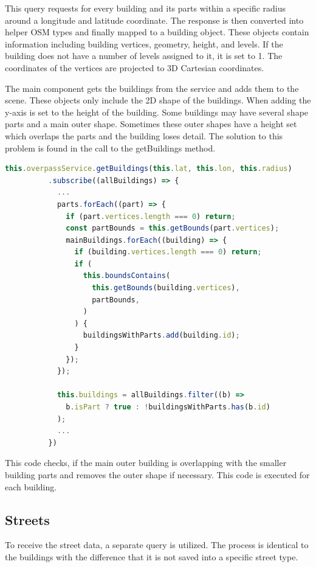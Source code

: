 This query requests for every building and its parts within a specific radius around a longitude and latitude coordinate. The response is then converted into helper OSM types and finally mapped to a building object. These objects contain information including building vertices, geometry, height, and levels. If the building does not have a number of levels assigned to it, it is set to 1. The coordinates of the vertices are projected to 3D Cartesian coordinates.

The main component gets the buildings from the service and adds them to the scene. These objects only include the 2D shape of the buildings. When adding the y-axis is set to the height of the building. Some buildings may have several shape parts and a main outer shape. Sometimes these outer shapes have a height set which overlaps the parts and the building loses detail. The solution to this problem is found in the call to the getBuildings method.

\begin{lstlisting}[language=JavaScript,caption=Building part filtering]
this.overpassService.getBuildings(this.lat, this.lon, this.radius)
          .subscribe((allBuildings) => {
            ...
            parts.forEach((part) => {
              if (part.vertices.length === 0) return;
              const partBounds = this.getBounds(part.vertices);
              mainBuildings.forEach((building) => {
                if (building.vertices.length === 0) return;
                if (
                  this.boundsContains(
                    this.getBounds(building.vertices),
                    partBounds,
                  )
                ) {
                  buildingsWithParts.add(building.id);
                }
              });
            });

            this.buildings = allBuildings.filter((b) =>
              b.isPart ? true : !buildingsWithParts.has(b.id)
            );
            ...
          })
\end{lstlisting}

This code checks, if the main outer building is overlapping with the smaller building parts and removes the outer shape if necessary. This code is executed for each building. 


\subsection{Streets}
To receive the street data, a separate query is utilized. The process is identical to the buildings with the difference that it is not saved into a specific street type.

